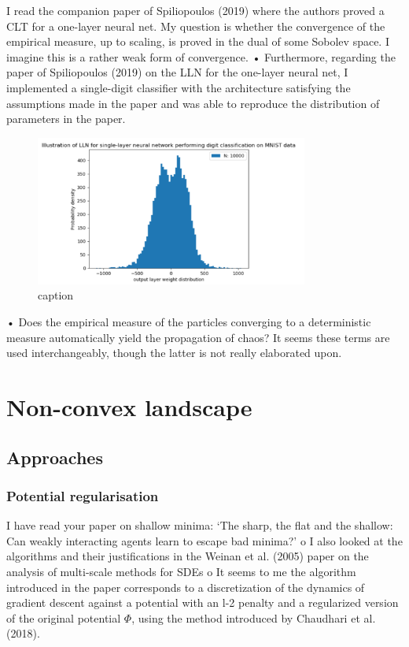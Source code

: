 \documentclass{article}
\begin{document}
I read the companion paper of Spiliopoulos (2019) where the authors proved a CLT for a one-layer neural net. My question is whether the convergence of the empirical measure, up to scaling, is proved in the dual of some Sobolev space. I imagine this is a rather weak form of convergence.
•	Furthermore, regarding the paper of Spiliopoulos (2019) on the LLN for the one-layer neural net, I implemented a single-digit classifier with the architecture satisfying the assumptions made in the paper and was able to reproduce the distribution of parameters in the paper.

\begin{figure}[H]
    \centering
    \includegraphics[width=0.8\textwidth]{images/Spiliopoulos2019-LLN-singleNN-mnist.png}
    \caption{ caption}
    \label{fig: label of figure}
\end{figure}

•	Does the empirical measure of the particles converging to a deterministic measure automatically yield the propagation of chaos? It seems these terms are used interchangeably, though the latter is not really elaborated upon.  


\section{Non-convex landscape}

\subsection{Approaches}
\subsubsection{Potential regularisation}
	I have read your paper on shallow minima: ‘The sharp, the flat and the shallow: Can weakly interacting agents learn to escape bad minima?’
o	I also looked at the algorithms and their justifications in the Weinan et al. (2005) paper on the analysis of multi-scale methods for SDEs
o	It seems to me the algorithm introduced in the paper corresponds to a discretization of the dynamics of gradient descent against a potential with an l-2 penalty and a regularized version of the original potential $\Phi$, using the method introduced by Chaudhari et al. (2018).
\end{document}

